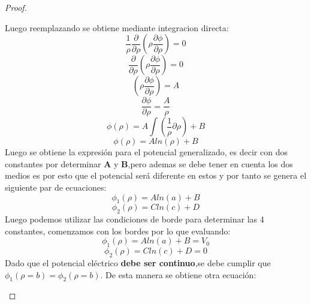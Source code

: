 \begin{proof}
\begin{enumerate}
\begin{equation}
        \end{equation}            
        Luego reemplazando se obtiene mediante integracion directa:
        \begin{equation}
            \frac{1}{\rho} \frac{\partial}{\partial\rho}\left(\rho \frac{\partial \phi}{\partial \rho}\right) = 0
        \end{equation}
        \begin{equation}
            \frac{\partial}{\partial\rho}\left(\rho \frac{\partial \phi}{\partial \rho}\right) = 0
        \end{equation}
        \begin{equation}
             \left(\rho \frac{\partial \phi}{\partial \rho}\right) = A
        \end{equation}
        \begin{equation}
             \frac{\partial \phi}{\partial \rho} = \frac{A}{\rho}
        \end{equation}
        \begin{equation}
             \phi(\rho) = A\int\left(\frac{1}{\rho}\partial\rho\right) + B
        \end{equation}
        \begin{equation}
              \phi(\rho) = Aln(\rho) + B
        \end{equation}
        Luego se obtiene la expresión para el potencial generalizado, es decir con dos constantes por determinar \textbf{A} y \textbf{B},pero ademas se debe tener en cuenta los dos medios es por esto que el potencial será diferente en estos y por tanto se genera el siguiente par de ecuaciones:
        \begin{equation}
            \phi_{1}(\rho) = Aln(a) + B 
        \end{equation}
        \begin{equation}
            \phi_{2}(\rho) = Cln(c) + D 
        \end{equation}
        Luego podemos utilizar las condiciones de borde para determinar las 4 constantes, comenzamos con los bordes por lo que evaluando:
        \begin{equation}
            \phi_{1}(\rho) = Aln(a) + B = V_{0}
        \end{equation}
        \begin{equation}
            \phi_{2}(\rho) = Cln(c) + D = 0
        \end{equation}
        Dado que el potencial eléctrico \textbf{debe ser continuo},se debe cumplir que $\phi_{1}(\rho=b) =\phi_{2}(\rho=b) $. De esta manera se obtiene otra ecuación:

\end{enumerate}
\end{proof}
